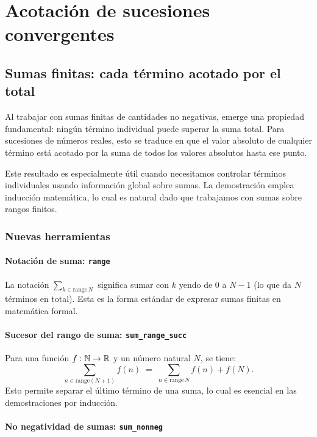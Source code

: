 \chapter{Acotación de sucesiones convergentes}

\section{Sumas finitas: cada término acotado por el total}

Al trabajar con sumas finitas de cantidades no negativas, emerge una
propiedad fundamental: ningún término individual puede superar la suma
total. Para sucesiones de números reales, esto se traduce en que el
valor absoluto de cualquier término está acotado por la suma de todos
los valores absolutos hasta ese punto.

Este resultado es especialmente útil cuando necesitamos controlar
términos individuales usando información global sobre sumas. La
demostración emplea inducción matemática, lo cual es natural dado que
trabajamos con sumas sobre rangos finitos.

\subsection{Nuevas herramientas}

\subsubsection{Notación de suma: \texttt{range}}

La notación $\sum_{k \in \mathrm{range}\, N}$ significa sumar con $k$
yendo de $0$ a $N-1$ (lo que da $N$ términos en total). Esta es la
forma estándar de expresar sumas finitas en matemática formal.

\subsubsection{Sucesor del rango de suma: \texttt{sum\_range\_succ}}

Para una función $f : \mathbb{N} \to \mathbb{R}$ y un número natural $N$, se tiene:
\[
  \sum_{n \in \mathrm{range}(N+1)} f(n)
  \;=\;
  \sum_{n \in \mathrm{range}\, N} f(n) + f(N).
\]
Esto permite separar el último término de una suma, lo cual es
esencial en las demostraciones por inducción.

\subsubsection{No negatividad de sumas: \texttt{sum\_nonneg}}

